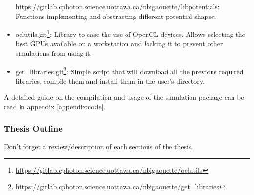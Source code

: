 \begin{itemize}
{{    https://gitlab.cphoton.science.uottawa.ca/nbigaouette/libpotentials}}:
    Functions implementing and abstracting different potential shapes.
\item oclutils.git\footnote{ \url{
    https://gitlab.cphoton.science.uottawa.ca/nbigaouette/oclutils}}:
    Library to ease the use of OpenCL devices. Allows selecting the best GPUs
    available on a workstation and locking it to prevent other simulations from
    using it.
\item get\_libraries.git\footnote{ \url{
    https://gitlab.cphoton.science.uottawa.ca/nbigaouette/get_libraries}}:
    Simple script that will download all the previous required libraries,
    compile them and install them in the user's directory.
\end{itemize}
A detailed guide on the compilation and usage of the simulation package can be
read in appendix \ref{appendix:code}.


\subsubsection{Thesis Outline}
Don't forget a review/description of each sections of the thesis.



